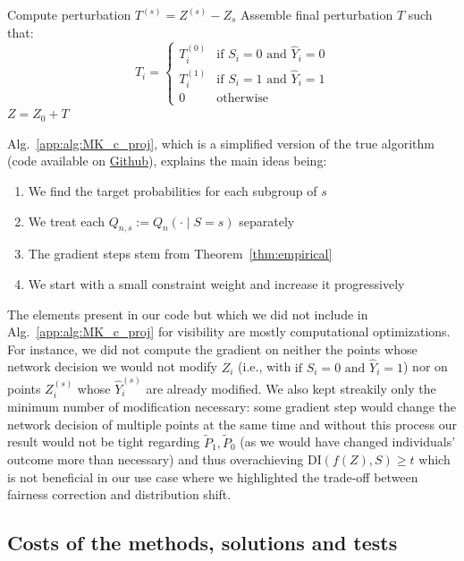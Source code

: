 \documentclass[runningheads, orivec]{llncs}
\begin{document}
\begin{algorithm}[H]
\begin{algorithmic}[1]
    \EndWhile
    \State Compute perturbation $T^{(s)} = Z^{(s)} - Z_s$
\EndFor
\State Assemble final perturbation $T$ such that:
\[
T_i = 
\begin{cases}
T^{(0)}_i & \text{if } S_i = 0 \text{ and } \widehat{Y}_i = 0 \\
T^{(1)}_i & \text{if } S_i = 1 \text{ and } \widehat{Y}_i = 1 \\
0 & \text{otherwise}
\end{cases}
\]
\State \Return $Z = Z_0 + T$
\end{algorithmic}
\end{algorithm}

Alg.~\ref{app:alg:MK_c_proj}, which is a simplified version of the true algorithm (code available on \href{https://github.com/ValentinLafargue/Inspection}{Github}), explains the main ideas being: 
\begin{enumerate}
    \item We find the target probabilities for each subgroup of $s$
    \item We treat each $Q_{n,s} := Q_n(\cdot \mid S = s)$ separately
    \item The gradient steps stem from Theorem~\ref{thm:empirical}
    \item We start with a small constraint weight and increase it progressively
\end{enumerate}

The elements present in our code but which we did not include in Alg.~\ref{app:alg:MK_c_proj} for visibility are mostly computational optimizations. For instance, we did not compute the gradient on neither the points whose network decision we would not modify $Z_i$ (i.e., with $\text{if } S_i = 0 \text{ and } \widehat{Y}_i = 1$) nor on points $Z_i^{(s)}$ whose $\widehat{Y}_i^{(s)}$ are already modified. We also kept streakily only the minimum number of modification necessary: some gradient step would change the network decision of multiple points at the same time and without this process our result would not be tight regarding $\tilde{P}_1, \tilde{P}_0 $ (as we would have changed individuals' outcome more than necessary) and thus overachieving $\mathrm{DI}(f(Z), S) \geq t$ which is not beneficial in our use case where we highlighted the trade-off between fairness correction and distribution shift.

\subsection{Costs of the methods, solutions and tests}
\label{app:sec:cost}
\end{document}
